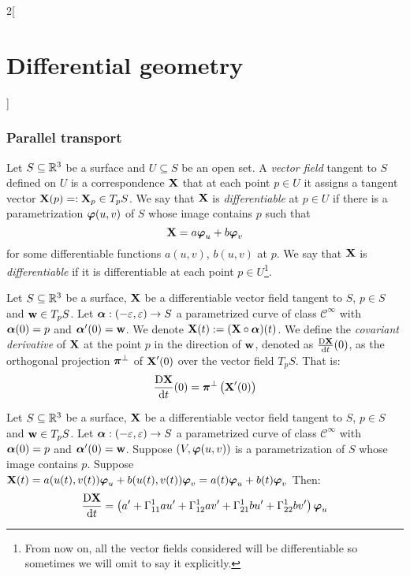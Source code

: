 \documentclass[../../../main_math.tex]{subfiles}
\begin{document}
\begin{multicols}{2}[\section{Differential geometry}]
  \subsubsection{Parallel transport}
  \begin{definition}
    Let $S\subseteq\mathbb{R}^3$ be a surface and $U\subseteq S$ be an open set. A \emph{vector field} tangent to $S$ defined on $U$ is a correspondence $\boldsymbol{\mathrm{X}}$ that at each point $p\in U$ it assigns a tangent vector $\boldsymbol{\mathrm{X}}(p)=:\boldsymbol{\mathrm{X}}_p\in T_pS$. We say that $\boldsymbol{\mathrm{X}}$ is \emph{differentiable} at $p\in U$ if there is a parametrization $\boldsymbol{\mathrm{\varphi}}(u,v)$ of $S$ whose image contains $p$ such that $$\boldsymbol{\mathrm{X}}=a\boldsymbol{\mathrm{\varphi}}_u+b\boldsymbol{\mathrm{\varphi}}_v$$ for some differentiable functions $a(u,v)$, $b(u,v)$ at $p$. We say that $\boldsymbol{\mathrm{X}}$ is \emph{differentiable} if it is differentiable at each point $p\in U$\footnote{From now on, all the vector fields considered will be differentiable so sometimes we will omit to say it explicitly.}.
  \end{definition}
  \begin{definition}
    Let $S\subseteq\mathbb{R}^3$ be a surface, $\boldsymbol{\mathrm{X}}$ be a differentiable vector field tangent to $S$, $p\in S$ and $\boldsymbol{\mathrm{w}}\in T_pS$. Let $\boldsymbol{\mathrm{\alpha}}:(-\varepsilon,\varepsilon)\rightarrow S$ a parametrized curve of class $\mathcal{C}^\infty$ with $\boldsymbol{\mathrm{\alpha}}(0)=p$ and $\boldsymbol{\mathrm{\alpha}}'(0)=\boldsymbol{\mathrm{w}}$. We denote $\boldsymbol{\mathrm{X}}(t):=(\boldsymbol{\mathrm{X}}\circ\boldsymbol{\mathrm{\alpha}})(t)$. We define the \emph{covariant derivative} of $\boldsymbol{\mathrm{X}}$ at the point $p$ in the direction of $\boldsymbol{\mathrm{w}}$, denoted as $\frac{\text{D}\boldsymbol{\mathrm{X}}}{\dd{t}}(0)$, as the orthogonal projection $\boldsymbol{\mathrm{\pi}}^\perp$ of $\boldsymbol{\mathrm{X}}'(0)$ over the vector field $T_pS$. That is: $$\frac{\text{D}\boldsymbol{\mathrm{X}}}{\dd{t}}(0)=\boldsymbol{\mathrm{\pi}}^\perp\left(\boldsymbol{\mathrm{X}}'(0)\right)$$
  \end{definition}
  \begin{proposition}
    Let $S\subseteq\mathbb{R}^3$ be a surface, $\boldsymbol{\mathrm{X}}$ be a differentiable vector field tangent to $S$, $p\in S$ and $\boldsymbol{\mathrm{w}}\in T_pS$. Let $\boldsymbol{\mathrm{\alpha}}:(-\varepsilon,\varepsilon)\rightarrow S$ a parametrized curve of class $\mathcal{C}^\infty$ with $\boldsymbol{\mathrm{\alpha}}(0)=p$ and $\boldsymbol{\mathrm{\alpha}}'(0)=\boldsymbol{\mathrm{w}}$. Suppose $(V,\boldsymbol{\mathrm{\varphi}}(u,v))$ is a parametrization of $S$ whose image contains $p$. Suppose $\boldsymbol{\mathrm{X}}(t)=a(u(t),v(t))\boldsymbol{\mathrm{\varphi}}_u+b(u(t),v(t))\boldsymbol{\mathrm{\varphi}}_v=a(t)\boldsymbol{\mathrm{\varphi}}_u+b(t)\boldsymbol{\mathrm{\varphi}}_v$ Then:
    \begin{multline}\label{DG:covderivative}
      \frac{\text{D}\vf{X}}{\dd{t}}=\left(a'+\Gamma_{11}^1au'+\Gamma_{12}^1av'+\Gamma_{21}^1bu'+\Gamma_{22}^1bv'\right)\vf\varphi_u\\

\end{multline}
\end{proposition}
\end{multicols}
\end{document}

